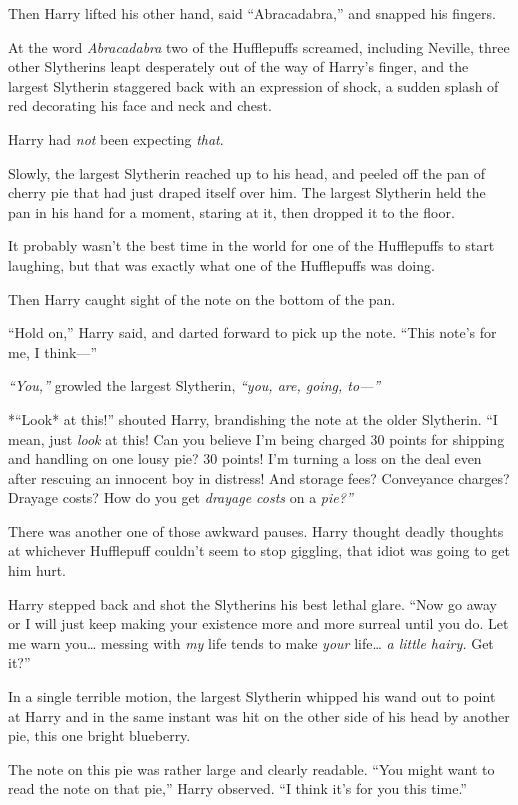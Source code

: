 Then Harry lifted his other hand, said ``Abracadabra,'' and snapped his
fingers.

At the word \emph{Abracadabra} two of the Hufflepuffs screamed,
including Neville, three other Slytherins leapt desperately out of the
way of Harry's finger, and the largest Slytherin staggered back with an
expression of shock, a sudden splash of red decorating his face and neck
and chest.

Harry had \emph{not} been expecting \emph{that}.

Slowly, the largest Slytherin reached up to his head, and peeled off the
pan of cherry pie that had just draped itself over him. The largest
Slytherin held the pan in his hand for a moment, staring at it, then
dropped it to the floor.

It probably wasn't the best time in the world for one of the Hufflepuffs
to start laughing, but that was exactly what one of the Hufflepuffs was
doing.

Then Harry caught sight of the note on the bottom of the pan.

``Hold on,'' Harry said, and darted forward to pick up the note. ``This
note's for me, I think---''

\emph{``You,''} growled the largest Slytherin, \emph{``you, are, going,
to---''}

*``Look* at this!'' shouted Harry, brandishing the note at the older
Slytherin. ``I mean, just \emph{look} at this! Can you believe I'm being
charged 30 points for shipping and handling on one lousy pie? 30 points!
I'm turning a loss on the deal even after rescuing an innocent boy in
distress! And storage fees? Conveyance charges? Drayage costs? How do
you get \emph{drayage costs} on a \emph{pie?''}

There was another one of those awkward pauses. Harry thought deadly
thoughts at whichever Hufflepuff couldn't seem to stop giggling, that
idiot was going to get him hurt.

Harry stepped back and shot the Slytherins his best lethal glare. ``Now
go away or I will just keep making your existence more and more surreal
until you do. Let me warn you\ldots{} messing with \emph{my} life tends
to make \emph{your} life\ldots{} \emph{a little hairy.} Get it?''

In a single terrible motion, the largest Slytherin whipped his wand out
to point at Harry and in the same instant was hit on the other side of
his head by another pie, this one bright blueberry.

The note on this pie was rather large and clearly readable. ``You might
want to read the note on that pie,'' Harry observed. ``I think it's for
you this time.''

